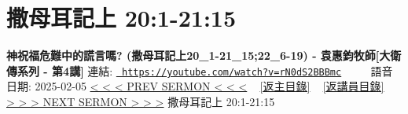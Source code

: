 \documentclass{book}
\begin{document}
\section{撒母耳記上 20:1-21:15}
\label{sec:rN0dS2BBBmc}
\textbf{神祝福危難中的謊言嗎?  (撒母耳記上20\_1-21\_15;22\_6-19) - 袁惠鈞牧師[大衛傳系列 - 第4講]}
\newline
\newline
連結: \href{https://youtube.com/watch?v=rN0dS2BBBmc}{\texttt{ https://youtube.com/watch?v=rN0dS2BBBmc}} ~~~~ 語音日期: 2025-02-05 
\newline
\newline
\hyperref[sec:9t69tF6ci0k]{< < < PREV SERMON < < <}
~
\hyperlink{toc}{[返主目錄]}
~
\hyperref[ch:preacher10]{[返講員目錄]}
~
\hyperref[sec:WCt7vYrgwVY]{> > > NEXT SERMON > > >}
\newline
\newline
撒母耳記上 20:1-21:15
\newline
\end{document}
